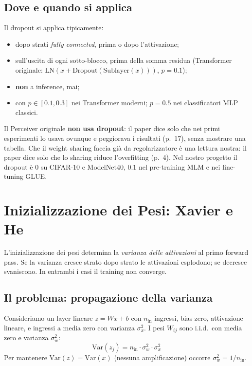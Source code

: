 \documentclass[
  11pt,
]{article}
\begin{document}
\subsection{Dove e quando si applica}

Il dropout si applica tipicamente:
\begin{itemize}
  \item dopo strati \emph{fully connected}, prima o dopo l'attivazione;
  \item sull'uscita di ogni sotto-blocco, prima della somma residua (Transformer originale: $\text{LN}(x + \text{Dropout}(\text{Sublayer}(x)))$, $p = 0.1$);
  \item \textbf{non} a inference, mai;
  \item con $p \in [0.1, 0.3]$ nei Transformer moderni; $p = 0.5$ nei classificatori MLP classici.
\end{itemize}

\begin{notabox}[title={\textbf{Collegamento al Perceiver}}]
Il Perceiver originale \textbf{non usa dropout}: il paper dice solo che nei primi esperimenti lo usava ovunque e peggiorava i risultati (p.~17), senza mostrare una tabella. Che il weight sharing faccia già da regolarizzatore è una lettura nostra: il paper dice solo che lo sharing riduce l'overfitting (p.~4). Nel nostro progetto il dropout è 0 su CIFAR-10 e ModelNet40, $0.1$ nel pre-training MLM e nei fine-tuning GLUE.
\end{notabox}

\section{Inizializzazione dei Pesi: Xavier e He}
\label{app:weight-init}

L'inizializzazione dei pesi determina la \emph{varianza delle attivazioni} al primo forward pass. Se la varianza cresce strato dopo strato le attivazioni esplodono; se decresce svaniscono. In entrambi i casi il training non converge.

\subsection{Il problema: propagazione della varianza}

Consideriamo un layer lineare $z = Wx + b$ con $n_{\text{in}}$ ingressi, bias zero, attivazione lineare, e ingressi a media zero con varianza $\sigma_x^2$. I pesi $W_{ij}$ sono i.i.d.\ con media zero e varianza $\sigma_w^2$:
\[
\text{Var}(z_j) = n_{\text{in}} \cdot \sigma_w^2 \cdot \sigma_x^2
\]
Per mantenere $\text{Var}(z) = \text{Var}(x)$ (nessuna amplificazione) occorre $\sigma_w^2 = 1/n_{\text{in}}$.
\end{document}
